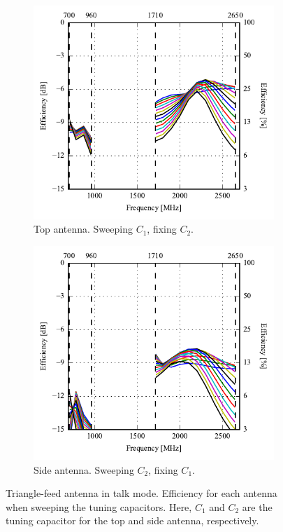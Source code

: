 \begin{figure}[htbp]
    \centering
    \begin{subfigure}{0.49\linewidth}
        \centering
        \includegraphics{img/tech_sol/trianglefeed/talk_mode/efficiency-ac1-Csh1.pdf}
        \caption{Top antenna. Sweeping $C_1$, fixing $C_2$.}
    \end{subfigure}
    \hfill
    \begin{subfigure}{0.49\linewidth}
        \centering
        \includegraphics{img/tech_sol/trianglefeed/talk_mode/efficiency-ac2-Csh2.pdf}
        \caption{Side antenna. Sweeping $C_2$, fixing $C_1$.}
    \end{subfigure}
    \caption{Triangle-feed antenna in talk mode. Efficiency for each antenna when sweeping the tuning capacitors. Here, $C_1$ and $C_2$ are the tuning capacitor for the top and side antenna, respectively.}
    \label{fig:eff_sol2talk}
\end{figure}


